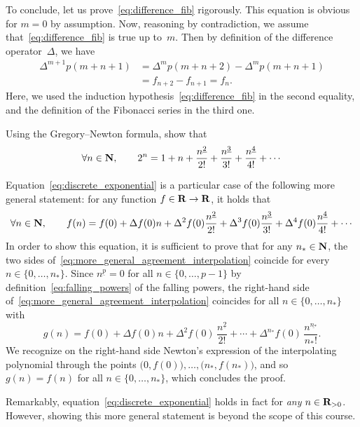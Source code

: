 \begin{solution}
    To conclude, let us prove~\eqref{eq:difference_fib} rigorously.
    This equation is obvious for $m = 0$ by assumption.
    Now, reasoning by contradiction, we assume that~\eqref{eq:difference_fib} is true up to~$m$.
    Then by definition of the difference operator~$\Delta$,
    we have
    \begin{align*}
        \Delta^{m+1} p(m+n+1)
        &= \Delta^m p(m+n+2) - \Delta^m p(m+n+1) \\
        &= f_{n+2} - f_{n+1} = f_n.
    \end{align*}
    Here, we used the induction hypothesis~\eqref{eq:difference_fib} in the second equality,
    and the definition of the Fibonacci series in the third one.
\end{solution}

\begin{exercise}
    Using the Gregory--Newton formula,
    show that
    \begin{equation}
        \label{eq:discrete_exponential}
        \forall n \in \mathbf N,
        \qquad 2^n = 1 + n + \frac{n^{\underline{2}}}{2!} + \frac{n^{\underline 3}}{3!} + \frac{n^{\underline 4}}{4!} + \dotsb
    \end{equation}
    \begin{solution}
        Equation~\eqref{eq:discrete_exponential} is a particular case of the following more general statement:
        for any function $f \in \mathbf R \to \mathbf R$,
        it holds that
        \begin{equation}
            \label{eq:more_general_agreement_interpolation}
            \forall n \in \mathbf N,
            \qquad f(n) = f(0) + \Delta f(0) n + \Delta^2 f(0) \frac{n^{\underline{2}}}{2!} + \Delta^3 f(0) \frac{n^{\underline 3}}{3!} + \Delta^4 f(0) \frac{n^{\underline 4}}{4!} + \dotsb
        \end{equation}
        In order to show this equation,
        it is sufficient to prove that for any $n_* \in \mathbf N$,
        the two sides of~\eqref{eq:more_general_agreement_interpolation} coincide for every $n \in \{0, \dotsc, n_*\}$.
        Since $n^{\underline p} = 0$ for all $n \in \{0, \dotsc, p-1\}$ by definition~\eqref{eq:falling_powers} of the falling powers,
        the right-hand side of~\eqref{eq:more_general_agreement_interpolation} coincides for all $n \in \{0, \dotsc, n_*\}$ with
        \[
            g(n) = f(0) + \Delta f(0) n + \Delta^2 f(0) \, \frac{n^{\underline{2}}}{2!} + \dotsb + \Delta^{n_*} f(0) \, \frac{n^{\underline {n_*}}}{{n_*}!}.
        \]
        We recognize on the right-hand side Newton's expression of the interpolating polynomial through the points $\bigl(0, f(0)\bigr), \dotsc, \bigl(n_*, f(n_*)\bigr)$,
        and so $g(n) = f(n)$ for all $n \in \{0, \dotsc, n_*\}$,
        which concludes the proof.
    \end{solution}
    \begin{remark}
        Remarkably, equation~\eqref{eq:discrete_exponential} holds in fact for \emph{any} $n \in \mathbf R_{> 0}$.
        However, showing this more general statement is beyond the scope of this course.
    \end{remark}
\end{exercise}

